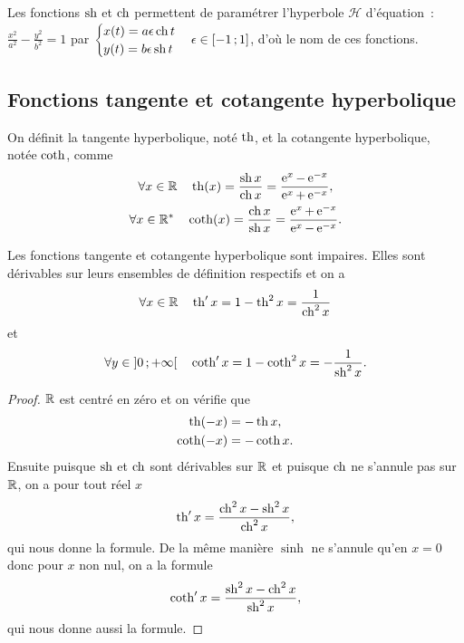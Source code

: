 %
Les fonctions \(\operatorname{sh}\) et \(\operatorname{ch}\) permettent de paramétrer l'hyperbole \(\mathcal{H}\) d'équation~: \(\frac{x^2}{a^2} - \frac{y^2}{b^2}=1\)  par \(\begin{cases} x(t)=a \epsilon \operatorname{ch} t \\ y(t)=b \epsilon \operatorname{sh} t\end{cases} \epsilon \in \left[ -1 \, ;  1 \right]\), d'où le nom de ces fonctions.
%
\subsection{Fonctions tangente et cotangente hyperbolique}
\label{subsec:chap1-tanhetcotanh}
\begin{defdef}
  On définit la tangente hyperbolique, noté \(\operatorname{th}\), et la cotangente hyperbolique, notée \(\operatorname{coth}\), comme
  \begin{gather}
    \forall x \in \mathbb{R} \quad \operatorname{th}(x)=\frac{\operatorname{sh} x}{\operatorname{ch} x}=\frac{\operatorname{e}^x - \operatorname{e}^{-x}}{\operatorname{e}^x+\operatorname{e}^{-x}}, \\
    \forall x \in \mathbb{R}^* \quad \operatorname{coth}(x)=\frac{\operatorname{ch} x}{\operatorname{sh} x}=\frac{\operatorname{e}^x + \operatorname{e}^{-x}}{\operatorname{e}^x-\operatorname{e}^{-x}}.
  \end{gather}
\end{defdef}
%
\begin{prop}
  Les fonctions tangente et cotangente hyperbolique sont impaires. Elles sont dérivables sur leurs ensembles de définition respectifs et on a
  \begin{equation}
    \forall x \in \mathbb{R} \quad \operatorname{th}' x = 1-\operatorname{th}^2 x = \frac{1}{\operatorname{ch}^2 x}
  \end{equation}
  et
  \begin{equation}
    \forall y \in \left] 0 \, ;  +\infty \right[ \quad \operatorname{coth}' x=1-\operatorname{coth}^2 x=-\frac{1}{\operatorname{sh}^2 x}.
  \end{equation}
\end{prop}
\begin{proof}
  \(\mathbb{R}\) est centré en zéro et on vérifie que
  \begin{gather}
    \operatorname{th}(-x)=-\operatorname{th} x, \\
    \operatorname{coth}(-x) = -\operatorname{coth} x.
  \end{gather}
  Ensuite puisque \(\operatorname{sh}\) et \(\operatorname{ch}\) sont dérivables sur \(\mathbb{R}\) et puisque \(\operatorname{ch}\) ne s'annule pas sur \(\mathbb{R}\), on a pour tout réel \(x\)
  \begin{equation}
    \operatorname{th}' x = \frac{\operatorname{ch}^2 x - \operatorname{sh}^2 x}{\operatorname{ch}^2 x},
  \end{equation}
  qui nous donne la formule. De la même manière \(\sinh\) ne s'annule qu'en \(x=0\) donc pour \(x\) non nul, on a la formule
  \begin{equation}
    \operatorname{coth}' x = \frac{\operatorname{sh}^2 x - \operatorname{ch}^2 x}{\operatorname{sh}^2 x},
  \end{equation}
  qui nous donne aussi la formule.
\end{proof}
